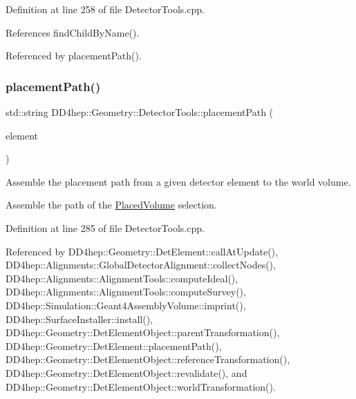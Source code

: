 Definition at line 258 of file Detector\+Tools.\+cpp.



References find\+Child\+By\+Name().



Referenced by placement\+Path().

\hypertarget{namespace_d_d4hep_1_1_geometry_1_1_detector_tools_a1ca0d88ab941b6dde4776c6b3b893fb6}{}\label{namespace_d_d4hep_1_1_geometry_1_1_detector_tools_a1ca0d88ab941b6dde4776c6b3b893fb6} 
\subsubsection{\texorpdfstring{placement\+Path()}{placementPath()}\hspace{0.1cm}{\footnotesize\ttfamily [1/5]}}
{\footnotesize\ttfamily std\+::string D\+D4hep\+::\+Geometry\+::\+Detector\+Tools\+::placement\+Path (\begin{DoxyParamCaption}\item[{\hyperlink{class_d_d4hep_1_1_geometry_1_1_det_element}{Det\+Element}}]{element }\end{DoxyParamCaption})}



Assemble the placement path from a given detector element to the world volume. 

Assemble the path of the \hyperlink{class_d_d4hep_1_1_geometry_1_1_placed_volume}{Placed\+Volume} selection. 

Definition at line 285 of file Detector\+Tools.\+cpp.



Referenced by D\+D4hep\+::\+Geometry\+::\+Det\+Element\+::call\+At\+Update(), D\+D4hep\+::\+Alignments\+::\+Global\+Detector\+Alignment\+::collect\+Nodes(), D\+D4hep\+::\+Alignments\+::\+Alignment\+Tools\+::compute\+Ideal(), D\+D4hep\+::\+Alignments\+::\+Alignment\+Tools\+::compute\+Survey(), D\+D4hep\+::\+Simulation\+::\+Geant4\+Assembly\+Volume\+::imprint(), D\+D4hep\+::\+Surface\+Installer\+::install(), D\+D4hep\+::\+Geometry\+::\+Det\+Element\+Object\+::parent\+Transformation(), D\+D4hep\+::\+Geometry\+::\+Det\+Element\+::placement\+Path(), D\+D4hep\+::\+Geometry\+::\+Det\+Element\+Object\+::reference\+Transformation(), D\+D4hep\+::\+Geometry\+::\+Det\+Element\+Object\+::revalidate(), and D\+D4hep\+::\+Geometry\+::\+Det\+Element\+Object\+::world\+Transformation().

